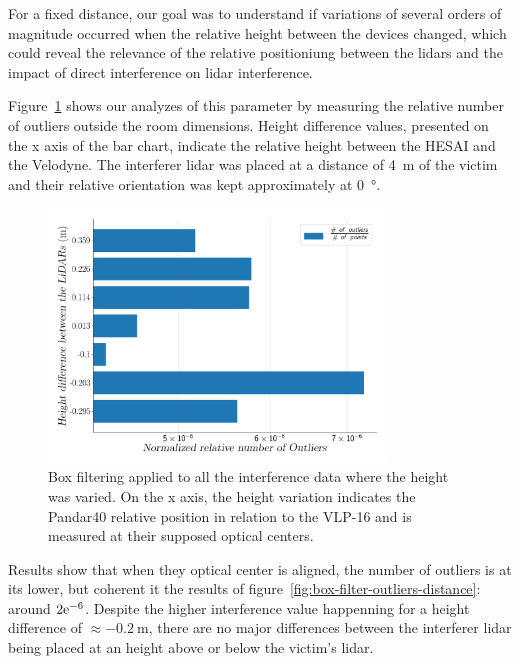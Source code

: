 For a fixed distance, our goal was to understand if variations of several orders of magnitude occurred when the relative height between the devices changed, which could reveal the relevance of the relative positioniung between the \acp{lidar} and the impact of direct interference on \ac{lidar} interference.

Figure~\ref{fig:box-filter-outliers-height} shows our analyzes of this parameter by measuring the relative number of outliers outside the room dimensions. Height difference values, presented on the x axis of the bar chart, indicate the relative height between the HESAI and the Velodyne. The interferer \ac{lidar} was placed at a distance of \SI{4}{\meter} of the victim and their relative orientation was kept approximately at \SI{0}{\degree}.

\begin{figure}[!ht]
	\centering
	\includegraphics[width=0.8\textwidth]{img/lidar-interference/box-filtering/interference-box-filter-outliers-height.png}
	\caption{Box filtering applied to all the interference data where the height was varied. On the x axis, the height variation indicates the Pandar40 relative position in relation to the VLP-16 and is measured at their supposed optical centers.}
	\label{fig:box-filter-outliers-height}
\end{figure}

Results show that when they optical center is aligned, the number of outliers is at its lower, but coherent it the results of figure~\ref{fig:box-filter-outliers-distance}: around $2\mathrm{e}^{-6}$. Despite the higher interference value happenning for a height difference of $\approx \SI{-0.2}{\meter}$, there are no major differences between the interferer \ac{lidar} being placed at an height above or below the victim's \ac{lidar}. 


